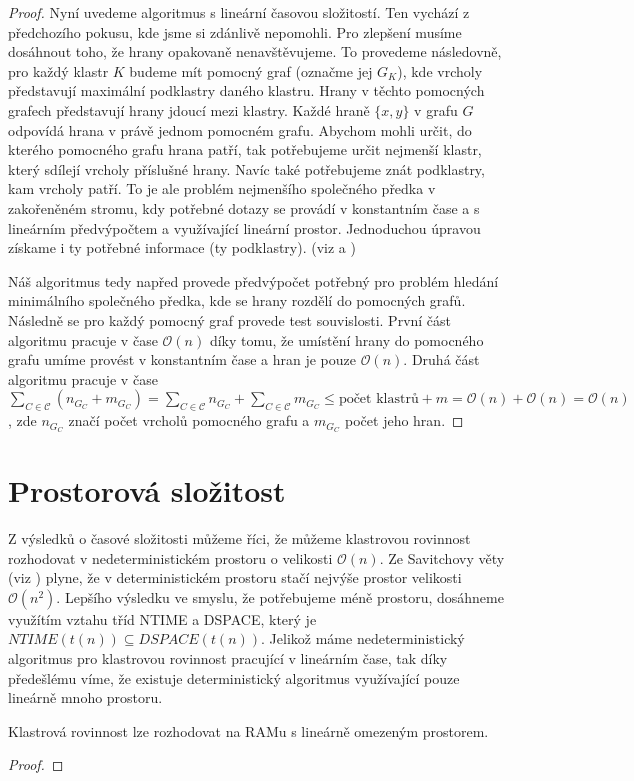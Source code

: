 \begin{proof}
Nyní uvedeme algoritmus s lineární časovou složitostí. Ten vychází z předchozího pokusu, kde jsme si zdánlivě nepomohli. Pro zlepšení musíme dosáhnout toho, že hrany opakovaně nenavštěvujeme. To provedeme následovně, pro každý klastr $K$ budeme mít pomocný graf (označme jej $G_K$), kde vrcholy představují maximální podklastry daného klastru. Hrany v těchto pomocných grafech představují hrany jdoucí mezi klastry. Každé hraně $\{x,y\}$ v grafu $G$ odpovídá hrana v právě jednom pomocném grafu. Abychom mohli určit, do kterého pomocného grafu hrana patří, tak potřebujeme určit nejmenší klastr, který sdílejí vrcholy příslušné hrany. Navíc také potřebujeme znát podklastry, kam vrcholy patří. To je ale problém nejmenšího společného předka v zakořeněném stromu, kdy potřebné dotazy se provádí v konstantním čase a s lineárním předvýpočtem a využívající lineární prostor. Jednoduchou úpravou získame i ty potřebné informace (ty podklastry). (viz \cite{lca} a \cite{rmq})

Náš algoritmus tedy napřed provede předvýpočet potřebný pro problém hledání minimálního společného předka, kde se hrany rozdělí do pomocných grafů. Následně se pro každý pomocný graf provede test souvislosti. První část algoritmu pracuje v čase $\mathcal{O}(n)$ díky tomu, že umístění hrany do pomocného grafu umíme provést v konstantním čase a hran je pouze $\mathcal{O}(n)$. Druhá část algoritmu pracuje v čase $\sum\limits_{C \in \mathcal C}(n_{G_C}+m_{G_C}) = \sum\limits_{C \in \mathcal C}n_{G_C} + \sum\limits_{C \in \mathcal C}m_{G_C} \leq \text{počet klastrů} + m = \mathcal O(n) + \mathcal O(n)=\mathcal O(n)$, zde $n_{G_C}$ značí počet vrcholů pomocného grafu a $m_{G_C}$ počet jeho hran.
\end{proof}

\section{Prostorová složitost}
Z výsledků o časové složitosti můžeme říci, že můžeme klastrovou rovinnost rozhodovat v nedeterministickém prostoru o velikosti $\mathcal{O}(n)$. Ze Savitchovy věty (viz \cite{savitch}) plyne, že v deterministickém prostoru stačí nejvýše prostor velikosti $\mathcal{O}(n^2)$.
Lepšího výsledku ve smyslu, že potřebujeme méně prostoru, dosáhneme využítím vztahu tříd NTIME a DSPACE, který je $NTIME(t(n)) \subseteq DSPACE(t(n))$. Jelikož máme nedeterministický algoritmus pro klastrovou rovinnost pracující v lineárním čase, tak díky předešlému víme, že existuje deterministický algoritmus využívající pouze lineárně mnoho prostoru.
\begin{tvr}
Klastrová rovinnost lze rozhodovat na RAMu s lineárně omezeným prostorem.
\end{tvr}
\begin{proof}
\end{proof}